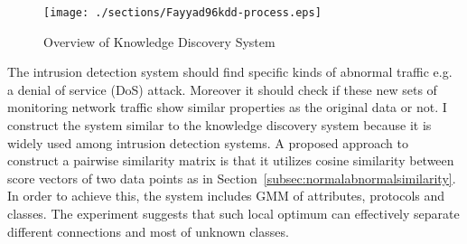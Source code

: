 \begin{figure}[htb2]
\begin{center}
\texttt{[image: ./sections/Fayyad96kdd-process.eps]}
\end{center}
\caption{Overview of Knowledge Discovery System}
\label{fig:refSingleRobot1}
\end{figure}
The intrusion detection system should find specific kinds of abnormal traffic e.g. a denial of service (DoS) attack. 
Moreover it should check if these new sets of monitoring network traffic show similar properties as the original data or not. 
I construct the system similar to the knowledge discovery system \cite{fayyad96} because it is widely used among intrusion detection systems. 
A proposed approach to construct a pairwise similarity matrix is that it utilizes cosine similarity between score vectors of two data points as in Section~\ref{subsec:normalabnormalsimilarity}. 
In order to achieve this, the system includes GMM of attributes, protocols and classes. %
The experiment suggests that such local optimum can effectively separate different connections and most of unknown classes. 

